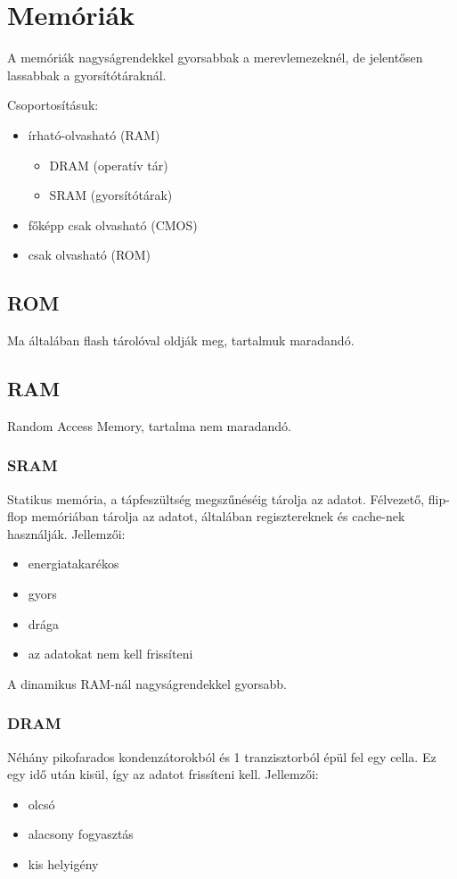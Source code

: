
\chapter{Memóriák}

A memóriák nagyságrendekkel gyorsabbak a merevlemezeknél, de jelentősen lassabbak a gyorsítótáraknál.

Csoportosításuk:
\begin{itemize}
    \item írható-olvasható (RAM)
    \begin{itemize}
        \item DRAM (operatív tár)
        \item SRAM (gyorsítótárak)
    \end{itemize}
    \item főképp csak olvasható (CMOS)
    \item csak olvasható (ROM)
\end{itemize}

\section{ROM}
Ma általában flash tárolóval oldják meg, tartalmuk maradandó.

\section{RAM}
Random Access Memory, tartalma nem maradandó.

\subsection{SRAM}
Statikus memória, a tápfeszültség megszűnéséig tárolja az adatot.
Félvezető, flip-flop memóriában tárolja az adatot, általában regisztereknek és cache-nek használják.
Jellemzői:
\begin{itemize}
    \item energiatakarékos
    \item gyors
    \item drága
    \item az adatokat nem kell frissíteni
\end{itemize}
A dinamikus RAM-nál nagyságrendekkel gyorsabb.

\subsection{DRAM}
Néhány pikofarados kondenzátorokból és 1 tranzisztorból épül fel egy cella.
Ez egy idő után kisül, így az adatot frissíteni kell.
Jellemzői:
\begin{itemize}
    \item olcsó
    \item alacsony fogyasztás
    \item kis helyigény
\end{itemize}

